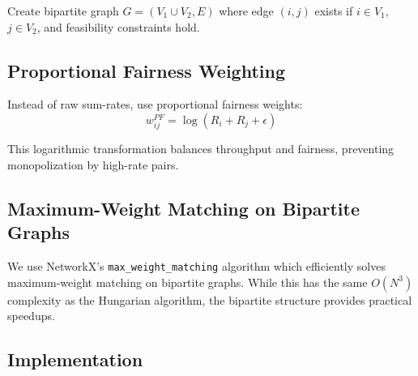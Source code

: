 Create bipartite graph $G = (V_1 \cup V_2, E)$ where edge $(i,j)$ exists if $i \in V_1$, $j \in V_2$, and feasibility constraints hold.

\subsection{Proportional Fairness Weighting}

Instead of raw sum-rates, use proportional fairness weights:
\begin{equation}
w_{ij}^{PF} = \log(R_i + R_j + \epsilon)
\end{equation}

This logarithmic transformation balances throughput and fairness, preventing monopolization by high-rate pairs.

\subsection{Maximum-Weight Matching on Bipartite Graphs}

We use NetworkX's \texttt{max\_weight\_matching} algorithm which efficiently solves maximum-weight matching on bipartite graphs. While this has the same $O(N^3)$ complexity as the Hungarian algorithm, the bipartite structure provides practical speedups.

\subsection{Implementation}

